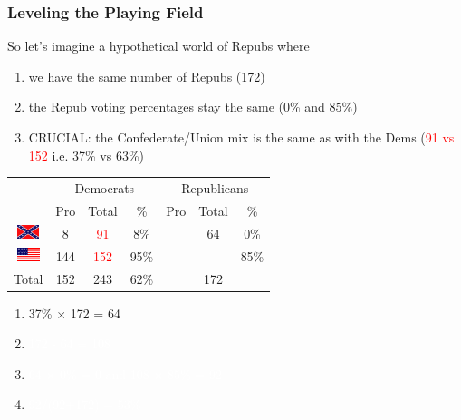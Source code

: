 \documentclass[slides]{beamer}\usepackage[]{graphicx}\usepackage[]{color}
\newcommand{\blue}[1]{\textcolor{blue2}{#1}}
\begin{document}
\begin{frame}
\frametitle{Leveling the Playing Field}
\begin{small}
So let's imagine a hypothetical world of Repubs where
\begin{enumerate}
\item we have the same number of Repubs (172)
\item the Repub voting percentages stay the same (0\% and 85\%)
\item CRUCIAL: the Confederate/Union mix is the same as with the Dems (\textcolor{red}{91 vs 152} i.e. 37\% vs 63\%) 
\end{enumerate}
\end{small}


\begin{center}
	\begin{tabular}{c|ccc|ccc}
     & \multicolumn{3}{c|}{Democrats}  & \multicolumn{3}{c}{Republicans} \\ 
     & Pro & Total & \% & Pro & Total & \% \\ 
     \hline
     \includegraphics[height=0.4cm]{conf} & 8 & \textcolor{red}{91} & 8\% &  & 64 & 0\% \\ 
	 \includegraphics[height=0.4cm]{union} & 144 & \textcolor{red}{152} & 95\% &  &  & 85\% \\ 
    \hline
     Total & 152 & 243 & 62\% & & 172 & \blue{} \\ 
  \end{tabular}
\end{center}

\begin{enumerate}
\item 37\% $\times$ 172 = 64
\item[] \textcolor{white}{172 - 64 = 108}
\item[] \textcolor{white}{64 $\times$ 0\% = 0 and 108 $\times$ 85\% = 92}
\item[] \textcolor{white}{92/(92+172) = 53\%}
\end{enumerate}

\end{frame}
\end{document}

